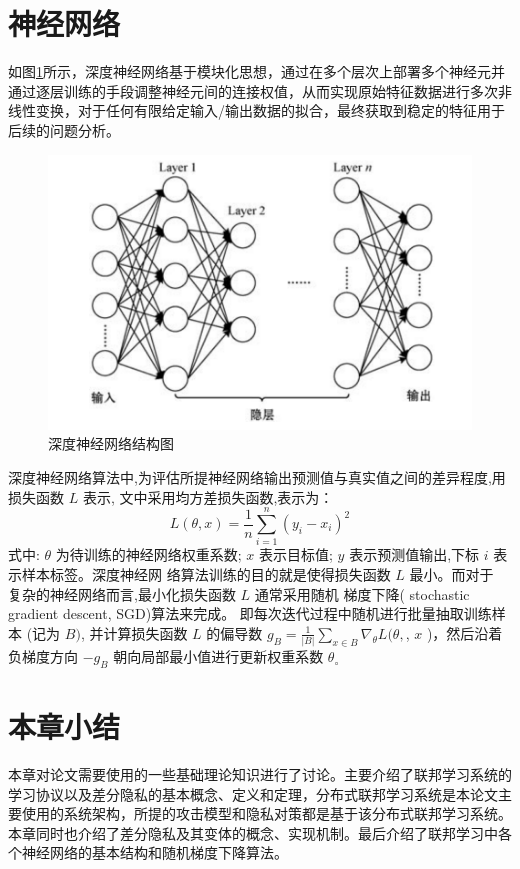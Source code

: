 \section{神经网络}
如图\ref{fig:深度神经网络结构图}所示，深度神经网络基于模块化思想，通过在多个层次上部署多个神经元并通过逐层训练的手段调整神经元间的连接权值，从而实现原始特征数据进行多次非线性变换，对于任何有限给定输入/输出数据的拟合，最终获取到稳定的特征用于后续的问题分析。
\begin{figure}[!hbt]
\centering
	\includegraphics[scale=0.7]{fig2/C2/深度神经网络结构图}%
	\caption{深度神经网络结构图}
	\label{fig:深度神经网络结构图}	
\end{figure}

深度神经网络算法中,为评估所提神经网络输出预测值与真实值之间的差异程度,用损失函数 $L$ 表示, 文中采用均方差损失函数,表示为：
$$
L(\theta, x)=\frac{1}{n} \sum_{i=1}^{n}\left(y_{i}-x_{i}\right)^{2}
$$
式中: $\theta$ 为待训练的神经网络权重系数; $x$ 表示目标值; $y$ 表示预测值输出,下标 $i$ 表示样本标签。深度神经网 络算法训练的目的就是使得损失函数 $L$ 最小。而对于 复杂的神经网络而言,最小化损失函数 $L$ 通常采用随机 梯度下降( stochastic gradient descent, SGD)算法来完成。 即每次迭代过程中随机进行批量抽取训练样本 (记为 $B)$, 并计算损失函数 $L$ 的偏导数 $g_{B}=\frac{1}{|B|} \sum_{x \in B} \nabla_{\theta} L(\theta,$, $x$ )，然后沿着负梯度方向 $-g_{B}$ 朝向局部最小值进行更新权重系数 $\theta_{\circ}$

\section{本章小结}
本章对论文需要使用的一些基础理论知识进行了讨论。主要介绍了联邦学习系统的学习协议以及差分隐私的基本概念、定义和定理，分布式联邦学习系统是本论文主要使用的系统架构，所提的攻击模型和隐私对策都是基于该分布式联邦学习系统。本章同时也介绍了差分隐私及其变体的概念、实现机制。最后介绍了联邦学习中各个神经网络的基本结构和随机梯度下降算法。
